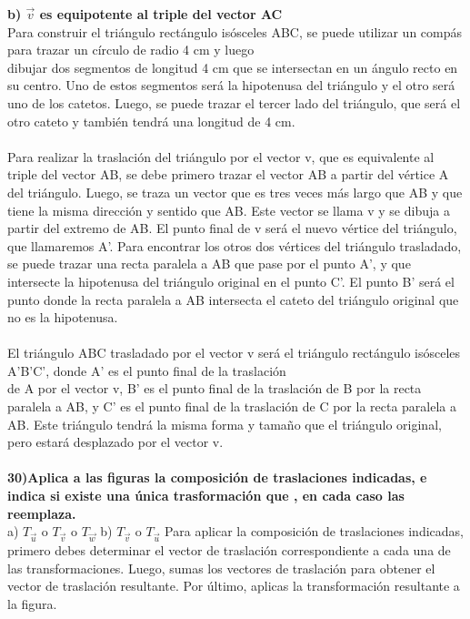 \documentclass{article}
\begin{document}
{\bf b) $\vec{v}$ es equipotente al triple del vector AC}\\
Para construir el triángulo rectángulo isósceles ABC, se puede utilizar un compás para trazar un círculo de radio 4 cm y luego\\
dibujar dos segmentos de longitud 4 cm que se intersectan en un ángulo recto en su centro. Uno de estos segmentos será la hipotenusa del triángulo y el otro será uno de los catetos. Luego, se puede trazar el tercer lado del triángulo, que será el otro cateto y también tendrá una longitud de 4 cm.\\
\\
Para realizar la traslación del triángulo por el vector v, que es equivalente al triple del vector AB, se debe primero trazar el vector AB a partir del vértice A del triángulo. Luego, se traza un vector que es tres veces más largo que AB y que tiene la misma dirección y sentido que AB. Este vector se llama v y se dibuja a partir del extremo de AB. El punto final de v será el nuevo vértice del triángulo, que llamaremos A'. Para encontrar los otros dos vértices del triángulo trasladado, se puede trazar una recta paralela a AB que pase por el punto A', y que intersecte la hipotenusa del triángulo original en el punto C'. El punto B' será el punto donde la recta paralela a AB intersecta el cateto del triángulo original que no es la hipotenusa.\\
\\
El triángulo ABC trasladado por el vector v será el triángulo rectángulo isósceles A'B'C', donde A' es el punto final de la traslación\\
de A por el vector v, B' es el punto final de la traslación de B por la recta paralela a AB, y C' es el punto final de la traslación de C por la recta paralela a AB. Este triángulo tendrá la misma forma y tamaño que el triángulo original, pero estará desplazado por el vector v.\\
\\

{\bf 30)Aplica a las figuras la composición de traslaciones indicadas, e indica si existe una única trasformación que , en cada caso las reemplaza. } \\
a) $T_{\vec{u}}$ o $T_{\vec{v}}$ o $T_{\vec{w}}$
b) $T_{\vec{v}}$ o $T_{\vec{u}}$ 
Para aplicar la composición de traslaciones indicadas, primero debes determinar el vector de traslación correspondiente a cada
una de las transformaciones. Luego, sumas los vectores de traslación para obtener el vector de traslación resultante. Por último, aplicas la transformación resultante a la figura.
\end{document}
